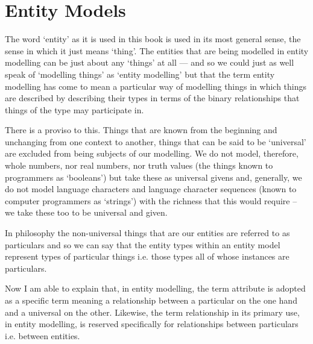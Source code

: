 

\section{Entity Models}
\label{EntityModels}
\mynote The word `entity' as it is used in this book is used in its most general sense,  the sense in which it just means `thing'. The entities that are being modelled in entity modelling can be just about any `things' at all --- and so we could just as well speak of `modelling things' as `entity modelling' but that the term entity modelling
has come to mean a particular way of modelling things in which things are described by describing their types in terms of the binary relationships that things of the type may participate in.

\mynote There is a proviso to this. 
Things that are known from the beginning and unchanging from one context to another, things that can be said to be `universal' are excluded from being subjects of our modelling. We do not model, therefore, whole numbers, nor real numbers, nor truth values 
(the things known to programmers as `booleans') but take these as universal givens and, generally, 
we do not model language characters and language character sequences 
(known to computer programmers as `strings') with the richness that this would require -- we take these too to be universal and given. 

\mynote In philosophy the non-universal things that are our entities are referred to as particulars and so we can say that the entity types within an entity model represent types of particular things i.e. those types all of whose instances are particulars.  

\mynote Now I am able to explain that, in entity modelling, the term attribute is adopted as a specific term meaning a relationship between a particular on the one hand and a universal on the other. Likewise, the term relationship 
in its primary use, in entity modelling, is reserved specifically for relationships between particulars i.e. between entities. 


